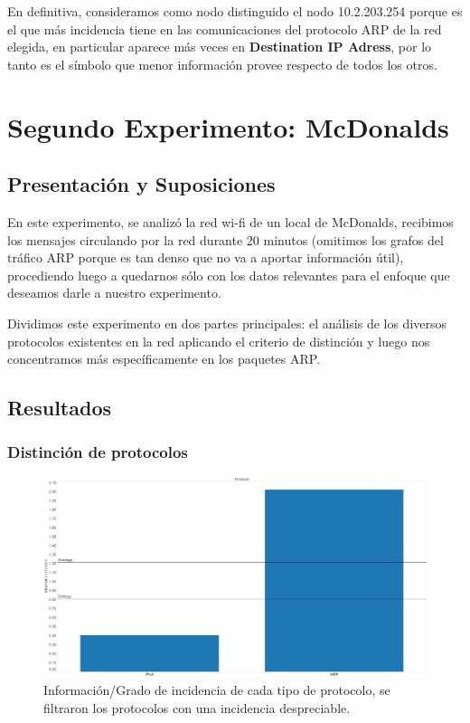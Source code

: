 \documentclass{article}
\theoremstyle{definition}
\theoremstyle{remark}
\begin{document}
En definitiva, consideramos como nodo distinguido el nodo 10.2.203.254 porque es el que más incidencia tiene en las comunicaciones del protocolo ARP de la red elegida, en particular aparece más veces en \textbf{Destination IP Adress}, por lo tanto es el símbolo que menor información provee respecto de todos los otros.

\newpage

\section{Segundo Experimento: McDonalds}

\subsection{Presentación y Suposiciones}

En este experimento, se analizó la red wi-fi de un local de McDonalds, recibimos los mensajes circulando por la red durante 20 minutos (omitimos los grafos del tráfico ARP porque es tan denso que no va a aportar información útil), procediendo luego a quedarnos sólo con los datos relevantes para el enfoque que deseamos darle a nuestro experimento.

Dividimos este experimento en dos partes principales: el análisis de los diversos protocolos existentes en la red aplicando el criterio de distinción y luego nos concentramos más específicamente en los paquetes ARP.
\subsection{Resultados}

\subsubsection{Distinción de protocolos}

\begin{figure}[H]
\centering
\includegraphics[width=450pt]{captures/McDonalds/20min/Protocol PDF Dashboard.png}
\caption{Información/Grado de incidencia de cada tipo de protocolo, se filtraron los protocolos con una incidencia despreciable.}
\end{figure}
\end{document}
